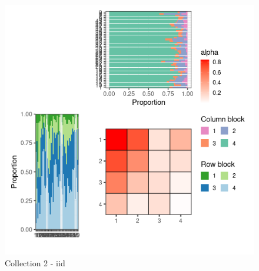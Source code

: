 \begin{figure}
\centering
\includegraphics{figure/iid_meso_plot-2.png}
\caption{Collection 2 - iid}
\end{figure}


